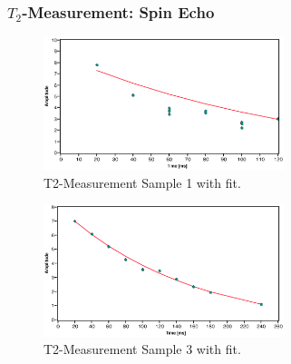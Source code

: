 \documentclass[aspectratio=169]{beamer}
\begin{document}
\begin{frame}
	\frametitle{$T_2$-Measurement: Spin Echo}
	\begin{minipage}[t]{0.45\textwidth}
		\centering
		\begin{figure}
			\includegraphics[width=70mm]{./Resources/t2_meas_p1.eps}
			\caption{T2-Measurement Sample 1 with fit.}
			\label{fig:t2_p1}
		\end{figure}
	\end{minipage}
	\hfill
	\begin{minipage}[t]{0.45\textwidth}
		\centering
		\begin{figure}
			\includegraphics[width=70mm]{./Resources/t2_meas_p3.eps}
			\caption{T2-Measurement Sample 3 with fit.}
			\label{fig:t2_p3}
		\end{figure}
	\end{minipage}
\end{frame}
\end{document}
